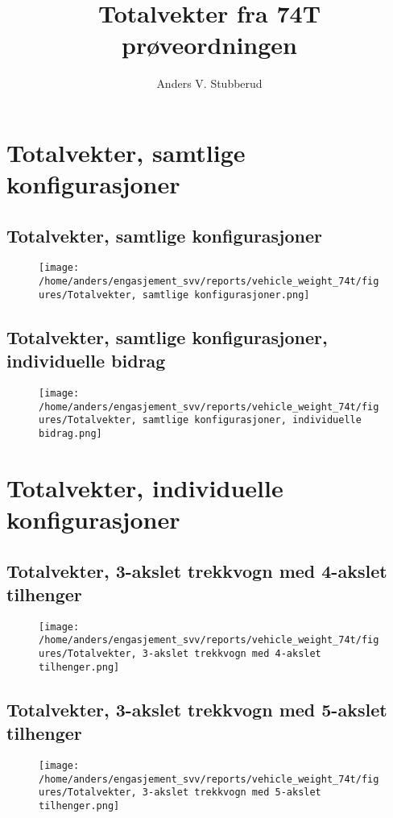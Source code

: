 \documentclass{article}
\begin{document}
\title{Totalvekter fra 74T prøveordningen}
\author{Anders V. Stubberud}
\maketitle
\tableofcontents
\newpage
\section{Totalvekter, samtlige konfigurasjoner}
\subsection{Totalvekter, samtlige konfigurasjoner}
\begin{figure}[H]
\centering
\texttt{[image: /home/anders/engasjement\_svv/reports/vehicle\_weight\_74t/figures/Totalvekter, samtlige konfigurasjoner.png]}
\end{figure}
\subsection{Totalvekter, samtlige konfigurasjoner, individuelle bidrag}
\begin{figure}[H]
\centering
\texttt{[image: /home/anders/engasjement\_svv/reports/vehicle\_weight\_74t/figures/Totalvekter, samtlige konfigurasjoner, individuelle bidrag.png]}
\end{figure}
\section{Totalvekter, individuelle konfigurasjoner}
\subsection{Totalvekter, 3-akslet trekkvogn med 4-akslet tilhenger}
\begin{figure}[H]
\centering
\texttt{[image: /home/anders/engasjement\_svv/reports/vehicle\_weight\_74t/figures/Totalvekter, 3-akslet trekkvogn med 4-akslet tilhenger.png]}
\end{figure}
\subsection{Totalvekter, 3-akslet trekkvogn med 5-akslet tilhenger}
\begin{figure}[H]
\centering
\texttt{[image: /home/anders/engasjement\_svv/reports/vehicle\_weight\_74t/figures/Totalvekter, 3-akslet trekkvogn med 5-akslet tilhenger.png]}
\end{figure}
\end{document}
